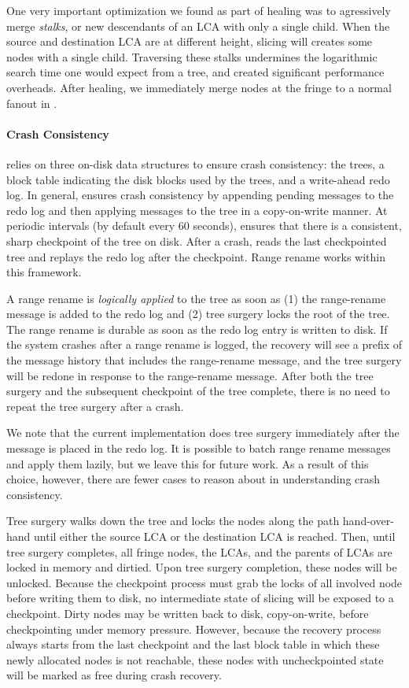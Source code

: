 One very important optimization we found as part of healing was to
agressively merge {\em stalks}, or new descendants of an LCA with
only a single child.
When the source and destination LCA are at different height, slicing
will creates some nodes with a single child.
Traversing these stalks undermines the logarithmic search time one would
expect from a tree, and created significant performance overheads.
After healing, we immediately merge nodes at the fringe
to a normal fanout in \bet.

\paragraph{Crash Consistency} \betrfs relies on three on-disk data structures to
ensure crash consistency: the trees, a block table indicating the disk blocks
used by the trees, and a write-ahead redo log. In general, \betrfs ensures crash
consistency by appending pending messages to the redo log and then applying
messages to the tree in a copy-on-write manner.
At periodic intervals (by default every 60 seconds), \betrfs ensures that there
is a consistent, sharp checkpoint of the tree on disk.
After a crash, \betrfs reads the last checkpointed tree and replays the redo log
after the checkpoint.
Range rename works within this framework.

A range rename is {\em logically applied} to the tree as soon as
(1) the range-rename message is added to the redo log and
(2) tree surgery locks the root of the tree.
The range rename is durable as soon as the redo log entry is written to disk.
If the system crashes after a range rename is logged, the recovery will see a
prefix of the message history that includes the range-rename message, and the
tree surgery will be redone in response to the range-rename message.
After both the tree surgery and the subsequent checkpoint of the tree complete,
there is no need to repeat the tree surgery after a crash.

We note that the current implementation does tree surgery immediately after the
message is placed in the redo log.
It is possible to batch range rename messages and apply them lazily,
but we leave this for future work.
As a result of this choice, however, there are fewer cases to reason about
in understanding crash consistency.

Tree surgery walks down the tree and locks the nodes along the path
hand-over-hand until either the source LCA or the destination LCA is reached.
Then, until tree surgery completes, all fringe nodes, the LCAs, and the parents
of LCAs are locked in memory and dirtied.
Upon tree surgery completion, these nodes will be unlocked.
Because the checkpoint process must grab the locks of all involved node before
writing them to disk,
no intermediate state of slicing will be exposed to a checkpoint.
Dirty nodes may be written back to disk, copy-on-write, before checkpointing
under memory pressure.
However, because the recovery process always starts from the last checkpoint and
the last block table in which these newly allocated nodes is not reachable,
these nodes with uncheckpointed state will be marked as free during crash
recovery.

